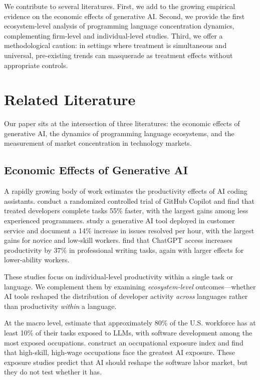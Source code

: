 \documentclass[12pt]{article}
\begin{document}
We contribute to several literatures. First, we add to the growing empirical evidence on the economic effects of generative AI. Second, we provide the first ecosystem-level analysis of programming language concentration dynamics, complementing firm-level and individual-level studies. Third, we offer a methodological caution: in settings where treatment is simultaneous and universal, pre-existing trends can masquerade as treatment effects without appropriate controls.

\section{Related Literature}

Our paper sits at the intersection of three literatures: the economic effects of generative AI, the dynamics of programming language ecosystems, and the measurement of market concentration in technology markets.

\subsection{Economic Effects of Generative AI}

A rapidly growing body of work estimates the productivity effects of AI coding assistants. \citet{peng2023impact} conduct a randomized controlled trial of GitHub Copilot and find that treated developers complete tasks 55\% faster, with the largest gains among less experienced programmers. \citet{brynjolfsson2023generative} study a generative AI tool deployed in customer service and document a 14\% increase in issues resolved per hour, with the largest gains for novice and low-skill workers. \citet{noy2023experimental} find that ChatGPT access increases productivity by 37\% in professional writing tasks, again with larger effects for lower-ability workers.

These studies focus on individual-level productivity within a single task or language. We complement them by examining \textit{ecosystem-level} outcomes---whether AI tools reshaped the distribution of developer activity \textit{across} languages rather than productivity \textit{within} a language.

At the macro level, \citet{eloundou2023gpts} estimate that approximately 80\% of the U.S. workforce has at least 10\% of their tasks exposed to LLMs, with software development among the most exposed occupations. \citet{felten2023occupational} construct an occupational exposure index and find that high-skill, high-wage occupations face the greatest AI exposure. These exposure studies predict that AI should reshape the software labor market, but they do not test whether it has.
\end{document}
